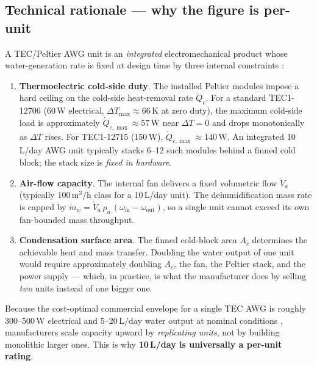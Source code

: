 \documentclass[11pt,a4paper]{article}
\newcommand{\SI}[2]{#1\,\ensuremath{\mathrm{#2}}}
\newcommand{\SIrange}[3]{#1--#2\,\ensuremath{\mathrm{#3}}}
\providecommand{\watt}{W}
\providecommand{\kelvin}{K}
\providecommand{\day}{day}
\providecommand{\liter}{L}
\begin{document}
\subsection{Technical rationale --- why the figure is per-unit}
A TEC/Peltier AWG unit is an \emph{integrated} electromechanical product whose water-generation rate is fixed at design time by three internal constraints \citep{enescu2019peltierreview,twaha2016teg_review,peltier_handbook_2018}:
\begin{enumerate}[leftmargin=*]
  \item \textbf{Thermoelectric cold-side duty}. The installed Peltier modules impose a hard ceiling on the cold-side heat-removal rate $\dot{Q}_c$. For a standard TEC1-12706 (\SI{60}{\watt} electrical, $\Delta T_{\max}{\approx}\SI{66}{\kelvin}$ at zero duty), the maximum cold-side load is approximately $\dot{Q}_{c,\max}{\approx}\SI{57}{\watt}$ near $\Delta T{=}0$ and drops monotonically as $\Delta T$ rises. For TEC1-12715 (\SI{150}{\watt}), $\dot{Q}_{c,\max}{\approx}\SI{140}{\watt}$. An integrated 10\,L/day AWG unit typically stacks 6--12 such modules behind a finned cold block; the stack size is \emph{fixed in hardware}.
  \item \textbf{Air-flow capacity}. The internal fan delivers a fixed volumetric flow $\dot{V}_a$ (typically $100\,\mathrm{m^3/h}$ class for a 10\,L/day unit). The dehumidification mass rate is capped by $\dot{m}_w = \dot{V}_a\,\rho_a\,(\omega_{\mathrm{in}}-\omega_{\mathrm{out}})$, so a single unit cannot exceed its own fan-bounded mass throughput.
  \item \textbf{Condensation surface area}. The finned cold-block area $A_c$ determines the achievable heat and mass transfer. Doubling the water output of one unit would require approximately doubling $A_c$, the fan, the Peltier stack, and the power supply --- which, in practice, is what the manufacturer does by selling \emph{two} units instead of one bigger one.
\end{enumerate}
Because the cost-optimal commercial envelope for a single TEC AWG is roughly \SIrange{300}{500}{\watt} electrical and \SIrange{5}{20}{\liter/\day} water output at nominal conditions \citep{salehi2020awgreview,ecoloblue2024, commercial_awg_retail_2025}, manufacturers scale capacity upward by \emph{replicating units}, not by building monolithic larger ones. This is why \textbf{10\,L/day is universally a per-unit rating}.
\end{document}
